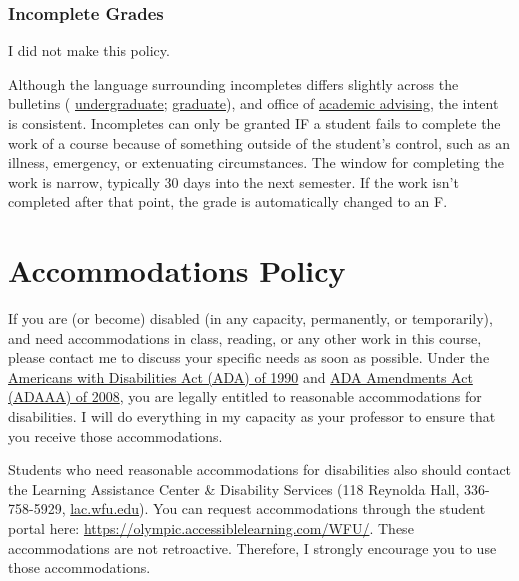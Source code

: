 \hypertarget{incomplete-grades}{%
\subsection{Incomplete Grades}\label{incomplete-grades}}

I did not make this policy.

Although the language surrounding incompletes differs slightly across the bulletins ( \href{https://bulletin.wfu.edu/undergraduate/procedures/exams-grading/\#:~:text=Incomplete\%20Grade}{undergraduate}; \href{https://bulletin.wfu.edu/graduate/procedures/grading/\#:~:text=Grade\%20of\%20I}{graduate}), and office of \href{https://advising.wfu.edu/academic-challenges/incompletes/}{academic advising}, the intent is consistent.
Incompletes can only be granted IF a student fails to complete the work of a course because of something outside of the student's control, such as an illness, emergency, or extenuating circumstances. The window for completing the work is narrow, typically 30 days into the next semester. If the work isn't completed after that point, the grade is automatically changed to an F.

\hypertarget{accommodations-policy}{%
\chapter{Accommodations Policy}\label{accommodations-policy}}

If you are (or become) disabled (in any capacity, permanently, or temporarily), and need accommodations in class, reading, or any other work in this course, please contact me to discuss your specific needs as soon as possible.
Under the \href{https://www.dol.gov/general/topic/disability/ada}{Americans with Disabilities Act (ADA) of 1990} and \href{https://en.wikipedia.org/wiki/ADA_Amendments_Act_of_2008}{ADA Amendments Act (ADAAA) of 2008}, you are legally entitled to reasonable accommodations for disabilities.
I will do everything in my capacity as your professor to ensure that you receive those accommodations.

Students who need reasonable accommodations for disabilities also should contact the Learning Assistance Center \& Disability Services (118 Reynolda Hall, 336-758-5929, \href{https://lac.wfu.edu/}{lac.wfu.edu}). You can request accommodations through the student portal here: \url{https://olympic.accessiblelearning.com/WFU/}. These accommodations are not retroactive. Therefore, I strongly encourage you to use those accommodations.

